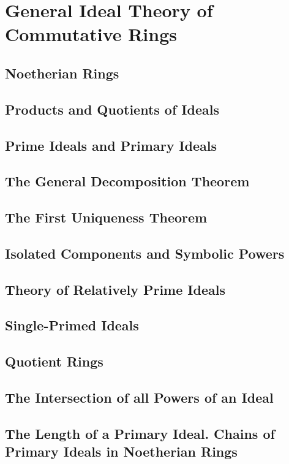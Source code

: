 \section{General Ideal Theory of Commutative Rings}

\subsection{Noetherian Rings}

\subsection{Products and Quotients of Ideals}

\subsection{Prime Ideals and Primary Ideals}

\subsection{The General Decomposition Theorem}

\subsection{The First Uniqueness Theorem}

\subsection{Isolated Components and Symbolic Powers}

\subsection{Theory of Relatively Prime Ideals}

\subsection{Single-Primed Ideals}

\subsection{Quotient Rings}

\subsection{The Intersection of all Powers of an Ideal}

\subsection{The Length of a Primary Ideal. Chains of Primary Ideals in Noetherian Rings}
